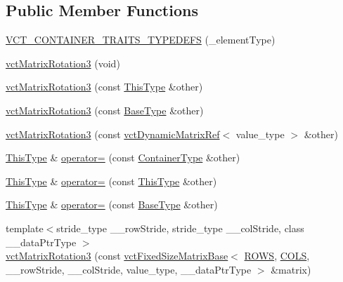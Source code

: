 \subsection*{Public Member Functions}
\begin{DoxyCompactItemize}
\item 
\hyperlink{classvct_matrix_rotation3_adbe5f2fc2338162c07322041a96e7c5c}{V\-C\-T\-\_\-\-C\-O\-N\-T\-A\-I\-N\-E\-R\-\_\-\-T\-R\-A\-I\-T\-S\-\_\-\-T\-Y\-P\-E\-D\-E\-F\-S} (\-\_\-element\-Type)
\item 
\hyperlink{classvct_matrix_rotation3_aa18a0aba9e5afb41c1279492d334cdcc}{vct\-Matrix\-Rotation3} (void)
\item 
\hyperlink{classvct_matrix_rotation3_af4d1ec8d30bccf86b158c2720e8bc735}{vct\-Matrix\-Rotation3} (const \hyperlink{classvct_fixed_size_const_matrix_base_a7ec66a96ed7e08ce9ff54093133c9d8d}{This\-Type} \&other)
\item 
\hyperlink{classvct_matrix_rotation3_a289c3541f606afd5b62b3df5da5f3c45}{vct\-Matrix\-Rotation3} (const \hyperlink{classvct_matrix_rotation3_a548c9a746fae0bfb7b4b1466a872f4dd}{Base\-Type} \&other)
\item 
\hyperlink{classvct_matrix_rotation3_a8c056c071df209ca53bc3ff8cb0a6a56}{vct\-Matrix\-Rotation3} (const \hyperlink{classvct_dynamic_matrix_ref}{vct\-Dynamic\-Matrix\-Ref}$<$ value\-\_\-type $>$ \&other)
\item 
\hyperlink{classvct_fixed_size_const_matrix_base_a7ec66a96ed7e08ce9ff54093133c9d8d}{This\-Type} \& \hyperlink{classvct_matrix_rotation3_aa9706d895d226eae4becea140501217c}{operator=} (const \hyperlink{classvct_matrix_rotation3_a1f8796d5368dbda35c3b57c6395b6dd0}{Container\-Type} \&other)
\item 
\hyperlink{classvct_fixed_size_const_matrix_base_a7ec66a96ed7e08ce9ff54093133c9d8d}{This\-Type} \& \hyperlink{classvct_matrix_rotation3_abc7b9b949adf10b20041c300310c27c9}{operator=} (const \hyperlink{classvct_fixed_size_const_matrix_base_a7ec66a96ed7e08ce9ff54093133c9d8d}{This\-Type} \&other)
\item 
\hyperlink{classvct_fixed_size_const_matrix_base_a7ec66a96ed7e08ce9ff54093133c9d8d}{This\-Type} \& \hyperlink{classvct_matrix_rotation3_adc94623f47cef42a0f55c4991e710cff}{operator=} (const \hyperlink{classvct_matrix_rotation3_a548c9a746fae0bfb7b4b1466a872f4dd}{Base\-Type} \&other)
\item 
{\footnotesize template$<$stride\-\_\-type \-\_\-\-\_\-row\-Stride, stride\-\_\-type \-\_\-\-\_\-col\-Stride, class \-\_\-\-\_\-data\-Ptr\-Type $>$ }\\\hyperlink{classvct_matrix_rotation3_af07f30bca51bba5ee1f57fbbe3c914b8}{vct\-Matrix\-Rotation3} (const \hyperlink{classvct_fixed_size_matrix_base}{vct\-Fixed\-Size\-Matrix\-Base}$<$ \hyperlink{classvct_matrix_rotation3_ac08ca99a9ddb4e59a896f765b4ae95bfa2e2c8802539f04eff93b4598b1fbb362}{R\-O\-W\-S}, \hyperlink{classvct_matrix_rotation3_ac08ca99a9ddb4e59a896f765b4ae95bfa8c935a63b595f6c48177e1213c36f787}{C\-O\-L\-S}, \-\_\-\-\_\-row\-Stride, \-\_\-\-\_\-col\-Stride, value\-\_\-type, \-\_\-\-\_\-data\-Ptr\-Type $>$ \&matrix)
\end{DoxyCompactItemize}
